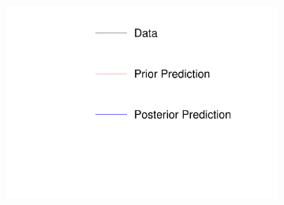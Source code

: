 \begin{figure}[!htbp]
\centering
\begin{subfigure}{.24\textwidth}
  \centering
  \includegraphics[width=\linewidth, clip]{figs/prior1dleg.pdf}
\end{subfigure}


\end{figure}
